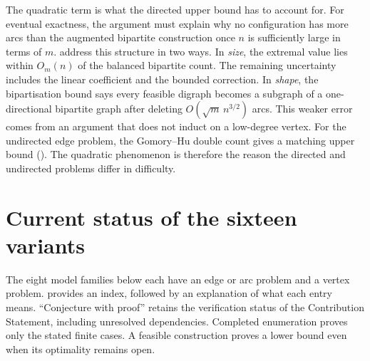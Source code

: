 The quadratic term is what the directed upper bound has to account for.
For eventual exactness, the argument must explain why no configuration has more
arcs than the augmented bipartite construction once $n$ is sufficiently large
in terms of $m$.
 address this structure in two ways.
In \emph{size}, the extremal value lies within $O_m(n)$ of the balanced bipartite count.
The remaining uncertainty includes the linear coefficient and the bounded correction.
In \emph{shape}, the bipartisation bound says every feasible digraph becomes a subgraph of a one-directional bipartite graph after deleting $O(\sqrt{m}\,n^{3/2})$ arcs.
This weaker error comes from an argument that does not induct on a low-degree vertex.
For the undirected edge problem, the Gomory--Hu double count gives a matching upper bound ().
The quadratic phenomenon is therefore the reason the directed and undirected problems differ in difficulty.

\section{Current status of the sixteen variants}

The eight model families below each have an edge or arc problem and a vertex
problem.  provides an index, followed by an explanation of
what each entry means. ``Conjecture with proof'' retains the verification
status of the Contribution Statement, including unresolved dependencies.
Completed enumeration proves only the stated finite cases. A feasible
construction proves a lower bound even when its optimality remains open.

